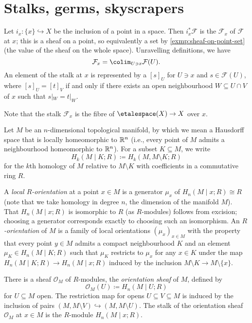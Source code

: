 \section{Stalks, germs, skyscrapers}

\begin{defn}\label{defn:stalk}
Let $i_x\colon \{x\} \hookrightarrow X$ be the inclusion of a point in a space.
Then $i_x^* \mathcal{F}$ is the  $\mathcal{F}_x$ of $\mathcal{F}$ at $x$; this is a sheaf on a point, so equivalently a set by \cref{exmp:sheaf-on-point-set} (the value of the sheaf on the whole space).
Unravelling definitions, we have \[
    \mathcal{F}_x = \colim_{U \ni x} \mathcal{F}(U)\text{.}
\]
An element of the stalk at $x$ is represented by a  $[s]_U$ for $U \ni x$ and $s \in \mathcal{F}(U)$, where \([s]_U = [t]_V\) if and only if there exists an open neighbourhood \(W\subseteq U\cap V\) of \(x\) such that \(s|_W=t|_W\).
\end{defn}
Note that the stalk $\mathcal{F}_x$ is the fibre of $\etalespace(X) \to X$ over $x$. 

\begin{exmp}
Let \(M\) be an \(n\)-dimensional topological manifold, by which we mean a Hausdorff space that is locally homeomorphic to \(\mathbb{R}^n\) (i.e., every point of \(M\) admits a neighbourhood homeomorphic to \(\mathbb{R}^n\)).
For a subset \(K\subseteq M\), we write \[H_k(M\mid K;R) \coloneq H_k(M,M\setminus K;R)\] for the \(k\)th homology of \(M\) relative to \(M\setminus K\) with coefficients in a commutative ring \(R\).

A \emph{local \(R\)-orientation} at a point \(x\in M\) is a generator \(\mu_x\) of \(H_n(M\mid x;R)\cong R\) (note that we take homology in degree \(n\), the dimension of the manifold \(M\)).
That \(H_n(M\mid x;R)\) is isomorphic to \(R\) (as \(R\)-modules) follows from excision; choosing a generator corresponds exactly to choosing such an isomorphism.
An \emph{\(R\)-orientation} of \(M\) is a family of local orientations \((\mu_x)_{x\in M}\) with the property that every point \(y\in M\) admits a compact neighbourhood \(K\) and an element \(\mu_K\in H_n(M\mid K;R)\) such that \(\mu_K\) restricts to \(\mu_x\) for any \(x\in K\) under the map \(H_n(M\mid K;R)\to H_n(M\mid x;R)\) induced by the inclusion \(M\setminus K\to M\setminus\{x\}\).

There is a sheaf \(\mathcal O_M\) of \(R\)-modules, the \emph{orientation sheaf} of \(M\), defined by
\[\mathcal O_M(U)\coloneq H_n(M\mid U;R)\]
for \(U\subseteq M\) open.
The restriction map for opens \(U\subseteq V\subseteq M\) is induced by the inclusion of pairs \((M,M\setminus V)\hookrightarrow(M,M\setminus U)\).
The stalk of the orientation sheaf \(\mathcal O_M\) at \(x\in M\) is the \(R\)-module \(H_n(M\mid x;R)\).
\end{exmp}

